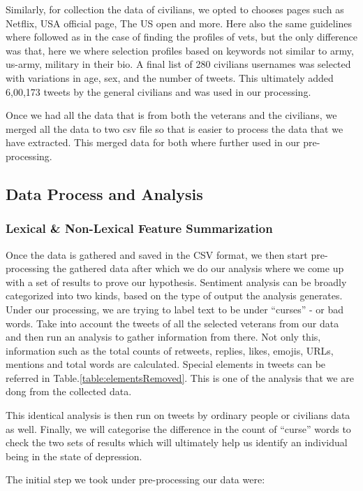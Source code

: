 Similarly, for collection the data of civilians, we opted to chooses pages such as Netflix, USA official page, The US open and more. Here also the same guidelines where followed as in the case of finding the profiles of vets, but the only difference was that, here we where selection profiles based on keywords not similar to army, us-army, military in their bio. A final list of 280 civilians usernames was selected with variations in age, sex, and the number of tweets. This ultimately added 6,00,173 tweets by the general civilians and was used in our processing.

Once we had all the data that is from both the veterans and the civilians, we merged all the data to two csv file so that is easier to process the data that we have extracted. This merged data for both where further used in our pre-processing.

\subsection{Data Process and Analysis}

\subsubsection{Lexical \& Non-Lexical Feature Summarization}

Once the data is gathered and saved in the CSV format, we then start pre-processing the gathered data after which we do our analysis where we come up with a set of results to prove our hypothesis. Sentiment analysis can be broadly categorized into two kinds, based on the type of output the analysis generates. Under our processing, we are trying to label text to be under \enquote{curses} - or bad words. Take into account the tweets of all the selected veterans from our data and then run an analysis to gather information from there. Not only this, information such as the total counts of retweets, replies, likes, emojis, URLs, mentions and total words are calculated. Special elements in tweets can be referred in Table.\ref{table:elementsRemoved}. This is one of the analysis that we are dong from the collected data.

This identical analysis is then run on tweets by ordinary people or civilians data as well. Finally, we will categorise the difference in the count of \enquote{curse} words to check the two sets of results which will ultimately help us identify an individual being in the state of depression.

The initial step we took under pre-processing our data were:

